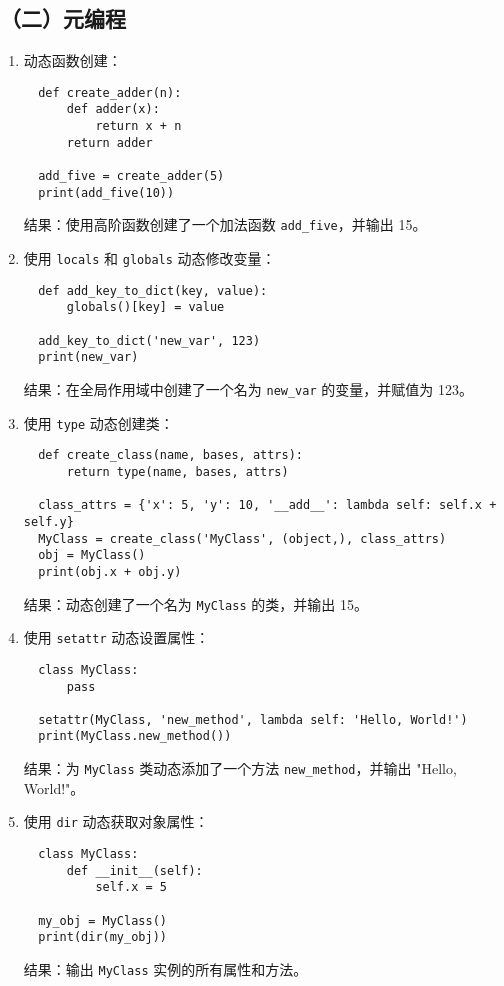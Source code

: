 \documentclass[UTF8]{ctexart}
\begin{document}
\subsection*{（二）元编程}
\begin{enumerate}
  \item 动态函数创建：
  \begin{verbatim}
  def create_adder(n):
      def adder(x):
          return x + n
      return adder

  add_five = create_adder(5)
  print(add_five(10))
  \end{verbatim}
  结果：使用高阶函数创建了一个加法函数 \texttt{add\_five}，并输出 15。
  
  \item 使用 \texttt{locals} 和 \texttt{globals} 动态修改变量：
  \begin{verbatim}
  def add_key_to_dict(key, value):
      globals()[key] = value

  add_key_to_dict('new_var', 123)
  print(new_var)
  \end{verbatim}
  结果：在全局作用域中创建了一个名为 \texttt{new\_var} 的变量，并赋值为 123。
  
  \item 使用 \texttt{type} 动态创建类：
  \begin{verbatim}
  def create_class(name, bases, attrs):
      return type(name, bases, attrs)

  class_attrs = {'x': 5, 'y': 10, '__add__': lambda self: self.x + self.y}
  MyClass = create_class('MyClass', (object,), class_attrs)
  obj = MyClass()
  print(obj.x + obj.y)
  \end{verbatim}
  结果：动态创建了一个名为 \texttt{MyClass} 的类，并输出 15。
  
  \item 使用 \texttt{setattr} 动态设置属性：
  \begin{verbatim}
  class MyClass:
      pass

  setattr(MyClass, 'new_method', lambda self: 'Hello, World!')
  print(MyClass.new_method())
  \end{verbatim}
  结果：为 \texttt{MyClass} 类动态添加了一个方法 \texttt{new\_method}，并输出 "Hello, World!"。
  
  \item 使用 \texttt{dir} 动态获取对象属性：
  \begin{verbatim}
  class MyClass:
      def __init__(self):
          self.x = 5

  my_obj = MyClass()
  print(dir(my_obj))
  \end{verbatim}
  结果：输出 \texttt{MyClass} 实例的所有属性和方法。
  

\end{enumerate}
\end{document}
